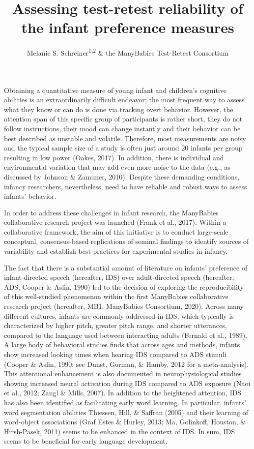 \documentclass[
  man,floatsintext]{apa6}
\title{Assessing test-retest reliability of the infant preference measures}
\author{Melanie S. Schreiner\textsuperscript{1,2} \& the ManyBabies Test-Retest Consortium\textsuperscript{}}
\date{}
\affiliation{\vspace{0.5cm}\textsuperscript{1} University of Goettingen\\\textsuperscript{2} Leibniz Science Campus PrimateCognition}
\begin{document}
\maketitle

Obtaining a quantitative measure of young infant and children's cognitive abilities is an extraordinarily difficult endeavor; the most frequent way to assess what they know or can do is done via tracking overt behavior. However, the attention span of this specific group of participants is rather short, they do not follow instructions, their mood can change instantly and their behavior can be best described as unstable and volatile. Therefore, most measurements are noisy and the typical sample size of a study is often just around 20 infants per group resulting in low power (Oakes, 2017). In addition, there is individual and environmental variation that may add even more noise to the data (e.g., as discussed by Johnson \& Zamuner, 2010). Despite these demanding conditions, infancy researchers, nevertheless, need to have reliable and robust ways to assess infants' behavior.

In order to address these challenges in infant research, the ManyBabies collaborative research project was launched (Frank et al., 2017). Within a collaborative framework, the aim of this initiative is to conduct large-scale conceptual, consensus-based replications of seminal findings to identify sources of variability and establish best practices for experimental studies in infancy.

The fact that there is a substantial amount of literature on infants' preference of infant-directed speech (hereafter, IDS) over adult-directed speech (hereafter, ADS, Cooper \& Aslin, 1990) led to the decision of exploring the reproducibility of this well-studied phenomenon within the first ManyBabies collaborative research project (hereafter, MB1, ManyBabies Consortium, 2020). Across many different cultures, infants are commonly addressed in IDS, which typically is characterized by higher pitch, greater pitch range, and shorter utterances, compared to the language used between interacting adults (Fernald et al., 1989). A large body of behavioral studies finds that across ages and methods, infants show increased looking times when hearing IDS compared to ADS stimuli (Cooper \& Aslin, 1990; see Dunst, Gorman, \& Hamby, 2012 for a meta-analysis). This attentional enhancement is also documented in neurophysiological studies showing increased neural activation during IDS compared to ADS exposure (Naoi et al., 2012; Zangl \& Mills, 2007). In addition to the heightened attention, IDS has also been identified as facilitating early word learning. In particular, infants' word segmentation abilities Thiessen, Hill, \& Saffran (2005) and their learning of word-object associations (Graf Estes \& Hurley, 2013; Ma, Golinkoff, Houston, \& Hirsh-Pasek, 2011) seems to be enhanced in the context of IDS. In sum, IDS seems to be beneficial for early language development.
\end{document}
